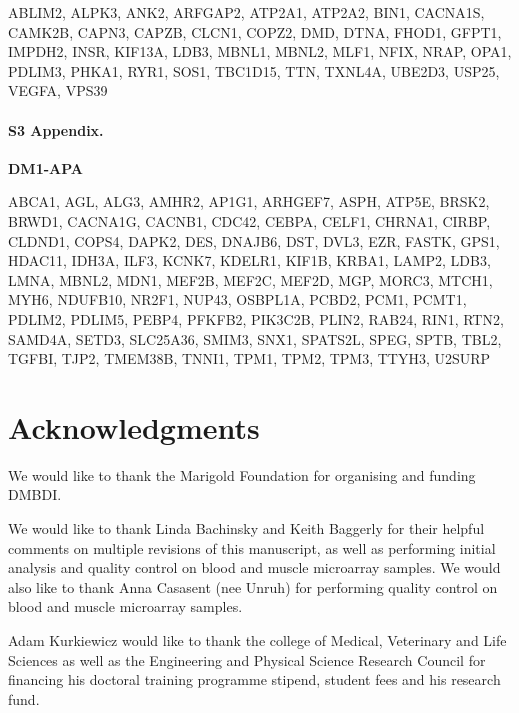 \documentclass[10pt,letterpaper]{article}
\begin{document}
ABLIM2, ALPK3, ANK2, ARFGAP2, ATP2A1, ATP2A2, BIN1, CACNA1S, CAMK2B, CAPN3, CAPZB, CLCN1, COPZ2, DMD, DTNA, FHOD1, GFPT1, IMPDH2, INSR, KIF13A, LDB3, MBNL1, MBNL2, MLF1, NFIX, NRAP, OPA1, PDLIM3, PHKA1, RYR1, SOS1, TBC1D15, TTN, TXNL4A, UBE2D3, USP25, VEGFA, VPS39

\paragraph*{S3 Appendix.}
\label{Appendix2}
{\bf DM1-APA}

ABCA1, AGL, ALG3, AMHR2, AP1G1, ARHGEF7, ASPH, ATP5E, BRSK2, BRWD1, CACNA1G, CACNB1, CDC42, CEBPA, CELF1, CHRNA1, CIRBP, CLDND1, COPS4, DAPK2, DES, DNAJB6, DST, DVL3, EZR, FASTK, GPS1, HDAC11, IDH3A, ILF3, KCNK7, KDELR1, KIF1B, KRBA1, LAMP2, LDB3, LMNA, MBNL2, MDN1, MEF2B, MEF2C, MEF2D, MGP, MORC3, MTCH1, MYH6, NDUFB10, NR2F1, NUP43, OSBPL1A, PCBD2, PCM1, PCMT1, PDLIM2, PDLIM5, PEBP4, PFKFB2, PIK3C2B, PLIN2, RAB24, RIN1, RTN2, SAMD4A, SETD3, SLC25A36, SMIM3, SNX1, SPATS2L, SPEG, SPTB, TBL2, TGFBI, TJP2, TMEM38B, TNNI1, TPM1, TPM2, TPM3, TTYH3, U2SURP


\section*{Acknowledgments}
We would like to thank the Marigold Foundation for organising and funding DMBDI.

We would like to thank Linda Bachinsky and Keith Baggerly for their helpful comments on multiple revisions of this manuscript, as well as performing initial analysis and quality control on blood and muscle microarray samples. We would also like to thank Anna Casasent (nee Unruh) for performing quality control on blood and muscle microarray samples.

Adam Kurkiewicz would like to thank the college of Medical, Veterinary and Life Sciences as well as the Engineering and Physical Science Research Council for financing his doctoral training programme stipend, student fees and his research fund.

\nolinenumbers

%
%
% 




\end{document}
